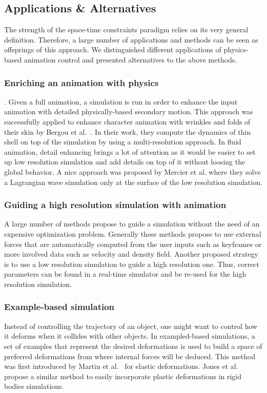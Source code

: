 \subsection{Applications \& Alternatives}
The strength of the space-time constraints paradigm relies on its very general definition. Therefore, a large number of applications and methods can be seen as offsprings of this approach. We distinguished different applications of physics-based animation control and presented alternatives to the above methods.

\subsubsection{Enriching an animation with physics}.
Given a full animation, a simulation is run in order to enhance the input animation with detailed physically-based secondary motion. This approach was successfully applied to enhance character animation with wrinkles and folds of their skin by Bergou et al.~\cite{Bergou2007}. In their work, they compute the dynamics of thin shell on top of the simulation by using a multi-resolution approach. In fluid animation, detail enhancing brings a lot of attention as it would be easier to set up low resolution simulation and add details on top of it without loosing the global behavior. A nice approach was proposed by Mercier et al. \cite{Mercier} where they solve a Lagrangian wave simulation only at the surface of the low resolution simulation.

\subsubsection{Guiding a high resolution simulation with animation}
A large number of methods propose to guide a simulation without the need of an expensive optimization problem. Generally these methods propose to use external forces that are automatically computed from the user inputs such as keyframes or more involved data such as velocity and density field. Another proposed strategy is to use a low resolution simulation to guide a high resolution one. Thus, correct parameters can be found in a real-time simulator and be re-used for the high resolution simulation.

\subsubsection{Example-based simulation}
Instead of controlling the trajectory of an object, one might want to control how it deforms when it collides with other objects. In exampled-based simulations, a set of examples that represent the desired deformations is used to build a space of preferred deformations from where internal forces will be deduced. This method was first introduced by Martin et al.~\cite{Martin2011} for elastic deformations. Jones et al.\cite{Jones2016} propose a similar method to easily incorporate plastic deformations in rigid bodies simulations.

